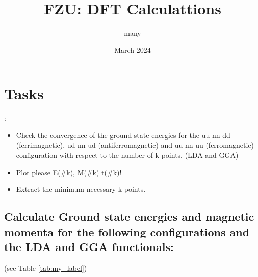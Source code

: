 \documentclass{article}
\title{FZU: DFT Calculattions}
\author{many}
\date{March 2024}
\begin{document}
\maketitle

\section{Tasks }:


\begin{itemize}
    \item Check the convergence of the ground state energies for the uu nn dd (ferrimagnetic), ud nn ud (antiferromagnetic)  and uu nn uu (ferromagnetic) configuration with respect to the number of k-points. (LDA and GGA)
    \item Plot please E(\#k), M(\#k)  t(\#k)!
    \item Extract the minimum necessary k-points. \textbf{}
\end{itemize}




\subsection{Calculate Ground state energies and magnetic momenta for the following
    configurations and the LDA and GGA functionals:}
(see Table \ref{tab:my_label})
\end{document}

